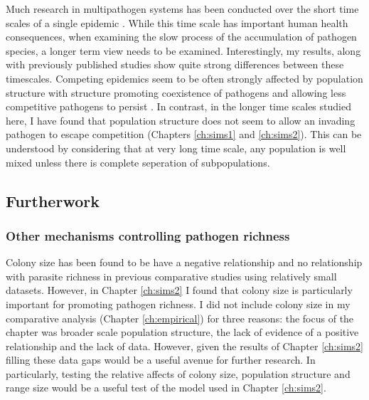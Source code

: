 Much research in multipathogen systems has been conducted over the short time scales of a single epidemic \cite{van2014domination, poletto2013host, poletto2015characterising, funk2010interacting}.
While this time scale has important human health consequences, when examining the slow process of the accumulation of pathogen species, a longer term view needs to be examined.
Interestingly, my results, along with previously published studies show quite strong differences between these timescales. 
Competing epidemics seem to be often strongly affected by population structure with structure promoting coexistence of pathogens and allowing less competitive pathogens to persist \cite{poletto2013host, poletto2015characterising}.
In contrast, in the longer time scales studied here, I have found that population structure does not seem to allow an invading pathogen to escape competition (Chapters \ref{ch:sims1} and \ref{ch:sims2}).
This can be understood by considering that at very long time scale, any population is well mixed unless there is complete seperation of subpopulations.



\subsection{Furtherwork}

\subsubsection{Other mechanisms controlling pathogen richness}

Colony size has been found to be have a negative relationship \cite{gay2014parasite} and no relationship \cite{turmelle2009correlates} with parasite richness in previous comparative studies using relatively small datasets.
However, in Chapter \ref{ch:sims2} I found that colony size is particularly important for promoting pathogen richness.
I did not include colony size in my comparative analysis (Chapter \ref{ch:empirical}) for three reasons: the focus of the chapter was broader scale population structure, the lack of evidence of a positive relationship \cite{gay2014parasite, turmelle2009correlates} and the lack of data.
However, given the results of Chapter \ref{ch:sims2} filling these data gaps would be a useful avenue for further research.
In particularly, testing the relative affects of colony size, population structure and range size would be a useful test of the model used in Chapter \ref{ch:sims2}.


